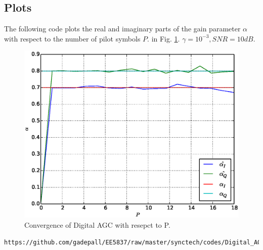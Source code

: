 \documentclass[journal,12pt,twocolumn]{IEEEtran}
\begin{document}
\subsection{Plots}
%

%
The following code plots the real and imaginary parts of the gain parameter $\alpha$ with respect to the number of pilot symbols $P$.
in Fig. \ref{fig:diffaoff}.  $\gamma = 10^{-3}, SNR=10 dB$.

%
\begin{figure}[!ht]
\begin{center}
\includegraphics[width=\columnwidth]{./figs/Convergence_of_Digital_AGC.eps}
\end{center}
\caption{Convergence of Digital AGC with resepct to P.}
\label{fig:diffaoff}
\end{figure}

\begin{lstlisting}
https://github.com/gadepall/EE5837/raw/master/synctech/codes/Digital_AGC_with_fixed_SNR.py
\end{lstlisting}
\end{document}
